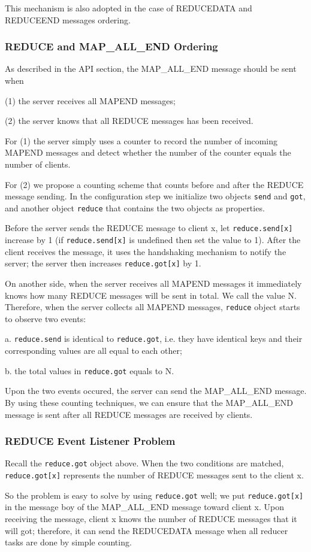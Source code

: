 This mechanism is also adopted in the case of REDUCEDATA and REDUCEEND messages ordering.

\subsubsection{REDUCE and MAP\_ALL\_END Ordering}

As described in the API section, the MAP\_ALL\_END message should be sent when

(1) the server receives all MAPEND messages;

(2) the server knows that all REDUCE messages has been received.

For (1) the server simply uses a counter to record the number of incoming MAPEND messages and detect whether the number of the counter equals the number of clients.

For (2) we propose a counting scheme that counts before and after the REDUCE message sending.
In the configuration step we initialize two objects \texttt{send} and \texttt{got}, and another object \texttt{reduce} that contains the two objects as properties.

Before the server sends the REDUCE message to client x, let \texttt{reduce.send[x]} increase by 1 (if \texttt{reduce.send[x]} is undefined then set the value to 1).
After the client receives the message, it uses the handshaking mechanism to notify the server; the server then increases \texttt{reduce.got[x]} by 1.

On another side, when the server receives all MAPEND messages it immediately knows how many REDUCE messages will be sent in total. We call the value N. Therefore, when the server collects all MAPEND messages, \texttt{reduce} object starts to observe two events:

a. \texttt{reduce.send} is identical to \texttt{reduce.got}, i.e. they have identical keys and their corresponding values are all equal to each other;

b. the total values in \texttt{reduce.got} equals to N.

Upon the two events occured, the server can send the MAP\_ALL\_END message. By using these counting techniques, we can ensure that the MAP\_ALL\_END message is sent after all REDUCE messages are received by clients.

\subsubsection{REDUCE Event Listener Problem}

Recall the \texttt{reduce.got} object above. When the two conditions are matched, \texttt{reduce.got[x]} represents the number of REDUCE messages sent to the client x.

So the problem is easy to solve by using \texttt{reduce.got} well; we put \texttt{reduce.got[x]} in the message boy of the MAP\_ALL\_END message toward client x. Upon receiving the message, client x knows the number of REDUCE messages that it will got; therefore, it can send the REDUCEDATA message when all reducer tasks are done by simple counting.
